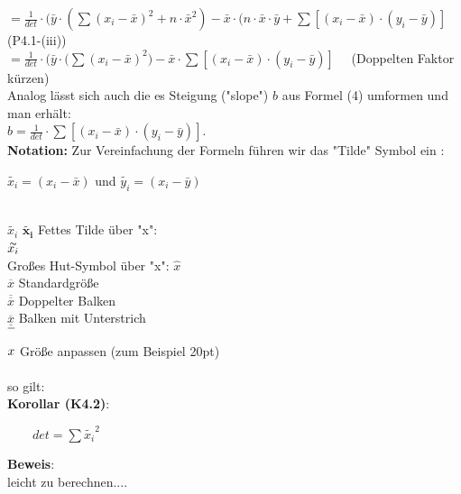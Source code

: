 \documentclass[12pt]{article}
\begin{document}
$ = \frac{1}{det} \cdot (\bar{y} \cdot (\sum{(x_i - \bar{x})^2} + n \cdot \bar{x}^2) - \bar{x} \cdot (n \cdot \bar{x} \cdot \bar{y} + \sum{[(x_i - \bar{x}) \cdot (y_i - \bar{y})]} $      (P4.1-(iii)) \\[0.2cm]
$ = \frac{1}{det} \cdot (\bar{y} \cdot (\sum{(x_i - \bar{x})^2)} - \bar{x} \cdot \sum{[(x_i - \bar{x}) \cdot (y_i - \bar{y})]} \quad $                                   (Doppelten Faktor kürzen)
\\[0.2cm]
Analog lässt sich auch die es Steigung ("slope") $b$ aus Formel (4) umformen und man erhält: \\[0.2cm]
$ b = \frac{1}{det} \cdot \sum{[(x_i - \bar{x}) \cdot (y_i - \bar{y})]}$.
\\[0.5cm]
%
\textbf{Notation:} Zur Vereinfachung der Formeln führen wir das "Tilde" Symbol ein : \\

\begin{center} 
 $ \widetilde{x_i} = (x_i - \bar{x}) $ und $ \widetilde{y_i} = (x_i - \bar{y}) $ \end{center}
%
{\color{red}{***********************************************************************\\ 
 ***********************  Einschub Latex Syntax... ********************************\\
************************************************************************}}\\[0.2cm]
$ \widetilde{{x_i}}$ $ \widetilde{\boldsymbol{x_i}}$ Fettes Tilde über "x":\\
$\accentset{\bm{\sim}}{x_i}$\\
%
Großes Hut-Symbol über "x": $\widehat{x}$\\
%
$\overline{x}$  Standardgröße \\
$\overline{\overline{x}}$  Doppelter Balken \\ 
$\overline{\underline{x}}$   Balken mit Unterstrich \\
$\overline{\rule{0pt}{20pt}x}$  Größe anpassen (zum Beispiel 20pt)\\[0.8cm]
{\color{red}{***********************************************************************\\ 
* ********* Ende Latex Syntax...*********************************************\\
************************************************************************}}\\[0.2cm]
%
so gilt:\\[0.2cm]
\textbf{Korollar (K4.2)}: 
\begin{center}
\begin{large}
 $ \qquad det = \sum{\widetilde{x_i}}^2 \qquad \qquad $ \\[0.2cm] 
\end{large}
\end{center}
%
\textbf{Beweis}:\\
leicht zu berechnen....\\
\end{document}
